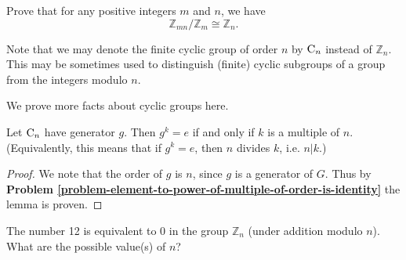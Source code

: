 \begin{exercise}\label{exercise-Zmn-mod-Zn-cong-Zn}
    Prove that for any positive integers $m$ and $n$, we have
    \[
        \mathbb{Z}_{mn} / \mathbb{Z}_m \cong \mathbb{Z}_n.
    \]
\end{exercise}

Note that we may denote the finite cyclic group of order $n$ by $\mathrm{C}_{n}$ instead of $\mathbb{Z}_n$. This may be sometimes used to distinguish (finite) cyclic subgroups of a group from the integers modulo $n$.

\newpage

We prove more facts about cyclic groups here.
\begin{lemma}\label{lemma-order-of-an-element-that-is-equivalent-to-identity}
    Let $\mathrm{C}_{n}$ have generator $g$. Then $g^k = e$ if and only if $k$ is a multiple of $n$.\newline
    (Equivalently, this means that if $g^k = e$, then $n$ divides $k$, i.e. $n | k$.)
\end{lemma}
\begin{proof}
    We note that the order of $g$ is $n$, since $g$ is a generator of $G$. Thus by \textbf{Problem \ref{problem-element-to-power-of-multiple-of-order-is-identity}} the lemma is proven.
\end{proof}

\begin{exercise}
    The number 12 is equivalent to 0 in the group $\mathbb{Z}_n$ (under addition modulo $n$). What are the possible value(s) of $n$?
\end{exercise}

